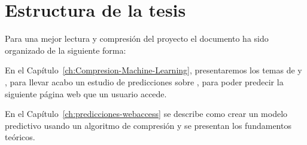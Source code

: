 %
%
\section{Estructura de la tesis} 




Para una mejor lectura y compresión del proyecto el documento ha sido organizado de la siguiente forma: 


En el Capítulo~\ref{ch:Compresion-Machine-Learning}, presentaremos los temas de \machinelearning y \losslessdatacompression, para llevar acabo un estudio de predicciones sobre \webasccesslog, para poder predecir la siguiente página web que un usuario accede.



En el Capítulo~\ref{ch:predicciones-webaccess} se describe como crear un modelo predictivo usando un algoritmo de compresión y se presentan los fundamentos teóricos.





